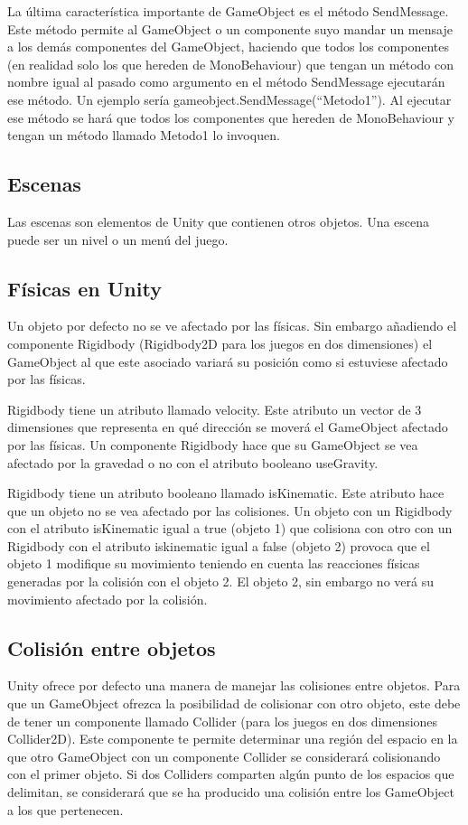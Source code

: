 La última característica importante de GameObject es el método SendMessage. Este método permite al GameObject o un componente suyo mandar un mensaje a los demás componentes del GameObject, haciendo que todos los componentes (en realidad solo los que hereden de MonoBehaviour) que tengan un método con nombre igual al pasado como argumento en el método SendMessage ejecutarán ese método. Un ejemplo sería gameobject.SendMessage(“Metodo1”). Al ejecutar ese método se hará que todos los componentes que hereden de MonoBehaviour y tengan un método llamado Metodo1 lo invoquen.

\subsection{Escenas}
Las escenas son elementos de Unity que contienen otros objetos. Una escena puede ser un nivel o un menú del juego.

\subsection{Físicas en Unity}
Un objeto por defecto no se ve afectado por las físicas. Sin embargo añadiendo el componente Rigidbody (Rigidbody2D para los juegos en dos dimensiones) el GameObject al que este asociado variará su posición como si estuviese afectado por las físicas.

Rigidbody tiene un atributo llamado velocity. Este atributo un vector de 3 dimensiones que representa en qué dirección se moverá el GameObject afectado por las físicas. Un componente Rigidbody hace que su GameObject se vea afectado por la gravedad o no con el atributo booleano useGravity.

Rigidbody tiene un atributo booleano llamado isKinematic. Este atributo hace que un objeto no se vea afectado por las colisiones. Un objeto con un Rigidbody con el atributo isKinematic igual a true (objeto 1) que colisiona con otro con un Rigidbody con el atributo iskinematic igual a false (objeto 2) provoca que el objeto 1 modifique su movimiento teniendo en cuenta las reacciones físicas generadas por la colisión con el objeto 2. El objeto 2, sin embargo no verá su movimiento afectado por la colisión.

\subsection{Colisión entre objetos}
Unity ofrece por defecto una manera de manejar las colisiones entre objetos. Para que un GameObject ofrezca la posibilidad de colisionar con otro objeto, este debe de tener un componente llamado Collider (para los juegos en dos dimensiones Collider2D). Este componente te permite determinar una región del espacio en la que otro GameObject con un componente Collider se considerará colisionando con el primer objeto. Si dos Colliders comparten algún punto de los espacios que delimitan, se considerará que se ha producido una colisión entre los GameObject a los que pertenecen. 

